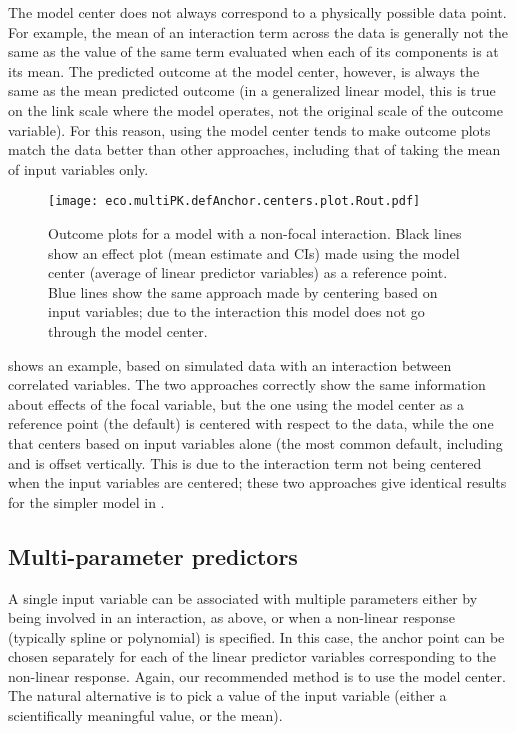 The model center does not always correspond to a physically possible data point. For example, the mean of an interaction term across the data is generally not the same as the value of the same term evaluated when each of its components is at its mean. The predicted outcome at the model center, however, is always the same as the mean predicted outcome (in a generalized linear model, this is true on the link scale where the model operates, not the original scale of the outcome variable). For this reason, using the model center tends to make outcome plots match the data better than other approaches, including that of taking the mean of input variables only.

\begin{figure}
\begin{center}
\texttt{[image: eco.multiPK.defAnchor.centers.plot.Rout.pdf]}
\end{center}
\caption{Outcome plots for a model with a non-focal interaction. Black lines show an effect plot (mean estimate and CIs) made using the model center (average of linear predictor variables) as a reference point. Blue lines show the same approach made by centering based on input variables; due to the interaction this model does not go through the model center.}
\end{figure}

 shows an example, based on simulated data with an interaction between correlated variables. The two approaches correctly show the same information about effects of the focal variable, but the one using the model center as a reference point (the  default) is centered with respect to the data, while the one that centers based on input variables alone (the most common default, including  and  is offset vertically. This is due to the interaction term not being centered when the input variables are centered; these two approaches give identical results for the simpler model in .

\subsection{Multi-parameter predictors}

A single input variable can be associated with multiple parameters either by being involved in an interaction, as above, or when a non-linear response (typically spline or polynomial) is specified. In this case, the anchor point can be chosen separately for each of the linear predictor variables corresponding to the non-linear response. Again, our recommended method is to use the model center. The natural alternative is to pick a value of the input variable (either a scientifically meaningful value, or the mean).

